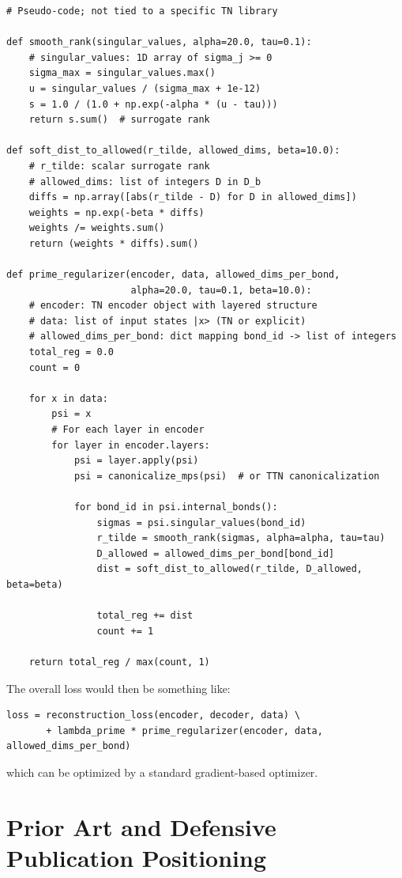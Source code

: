 \documentclass[11pt]{article}
\begin{document}
\begin{verbatim}
# Pseudo-code; not tied to a specific TN library

def smooth_rank(singular_values, alpha=20.0, tau=0.1):
    # singular_values: 1D array of sigma_j >= 0
    sigma_max = singular_values.max()
    u = singular_values / (sigma_max + 1e-12)
    s = 1.0 / (1.0 + np.exp(-alpha * (u - tau)))
    return s.sum()  # surrogate rank

def soft_dist_to_allowed(r_tilde, allowed_dims, beta=10.0):
    # r_tilde: scalar surrogate rank
    # allowed_dims: list of integers D in D_b
    diffs = np.array([abs(r_tilde - D) for D in allowed_dims])
    weights = np.exp(-beta * diffs)
    weights /= weights.sum()
    return (weights * diffs).sum()

def prime_regularizer(encoder, data, allowed_dims_per_bond, 
                      alpha=20.0, tau=0.1, beta=10.0):
    # encoder: TN encoder object with layered structure
    # data: list of input states |x> (TN or explicit)
    # allowed_dims_per_bond: dict mapping bond_id -> list of integers
    total_reg = 0.0
    count = 0

    for x in data:
        psi = x
        # For each layer in encoder
        for layer in encoder.layers:
            psi = layer.apply(psi)
            psi = canonicalize_mps(psi)  # or TTN canonicalization

            for bond_id in psi.internal_bonds():
                sigmas = psi.singular_values(bond_id)
                r_tilde = smooth_rank(sigmas, alpha=alpha, tau=tau)
                D_allowed = allowed_dims_per_bond[bond_id]
                dist = soft_dist_to_allowed(r_tilde, D_allowed, beta=beta)

                total_reg += dist
                count += 1

    return total_reg / max(count, 1)
\end{verbatim}

The overall loss would then be something like:
\begin{verbatim}
loss = reconstruction_loss(encoder, decoder, data) \
       + lambda_prime * prime_regularizer(encoder, data, allowed_dims_per_bond)
\end{verbatim}

which can be optimized by a standard gradient-based optimizer.

\section{Prior Art and Defensive Publication Positioning}
\end{document}
